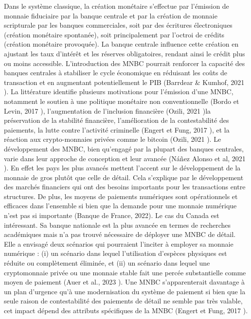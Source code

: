 \documentclass[12pt]{article}
\begin{document}
Dans le système classique, la création monétaire s'effectue par l'émission de monnaie fiduciaire par la banque centrale et par la création de monnaie scripturale par les banques commerciales, soit par des écritures électroniques (création monétaire spontanée), soit principalement par l'octroi de crédits (création monétaire provoquée). La banque centrale influence cette création en ajustant les taux d'intérêt et les réserves obligatoires, rendant ainsi le crédit plus ou moins accessible. L'introduction des MNBC pourrait renforcer la capacité des banques centrales à stabiliser le cycle économique en réduisant les coûts de transaction et en augmentant potentiellement le PIB (Barrdear \& Kumhof, 2021 \cite{barrdear_macroeconomics_2021} ). La littérature identifie plusieurs motivations pour l'émission d'une MNBC, notamment le soutien à une politique monétaire non conventionnelle (Bordo et Levin, 2017 \cite{RePEc:nbr:nberwo:23711}), l'augmentation de l'inclusion financière (Ozili, 2021 \cite{Ozili2021Central})la préservation de la stabilité financière, l'amélioration de la contestabilité des paiements, la lutte contre l'activité criminelle (Engert et Fung, 2017 \cite{RePEc:bca:bocadp:17-16}), et la réaction aux crypto-monnaies privées comme le bitcoin (Ozili, 2021 \cite{Ozili2021Central}). Le développement des MNBC, bien qu'engagé par la plupart des banques centrales, varie dans leur approche de conception et leur avancée (Náñez Alonso et al, 2021 \cite{RePEc:gam:jsusta:v:13:y:2021:i:8:p:4242-:d:534024}). En effet les pays les plus avancés mettent l'accent sur le développement de la monnaie de gros plutôt que celle de détail. Cela s'explique par le développement des marchés financiers qui ont des besoins importants pour les transactions entre structures. De plus, les moyens de paiements numériques sont opérationnels et efficaces dans l'ensemble si bien que la demande pour une monnaie numérique n'est pas si importante (Banque de France, 2022). Le cas du Canada est intéressant. Sa banque nationale est la plus avancée en termes de recherches académiques mais n'a pas trouvé nécessaire de déployer une MNBC de détail. Elle a envisagé deux scénarios qui pourraient l'inciter à employer sa monnaie numérique : (i) un scénario dans lequel l’utilisation d’espèces physiques est réduite ou complètement éliminée, et (ii) un scénario dans lequel une cryptomonnaie privée ou une monnaie stable fait une percée substantielle comme moyen de paiement (Auer et al., 2023 \cite{RePEc:bis:biswps:880}). Une MNBC s'apparenterait davantage à un plan d'urgence qu'à une modernisation du système de paiement si bien que la seule raison de contestabilité des paiements de détail ne semble pas très valable, cet impact dépend des attributs spécifiques de la MNBC (Engert et Fung, 2017 \cite{RePEc:bca:bocadp:17-16}).\\
\end{document}
